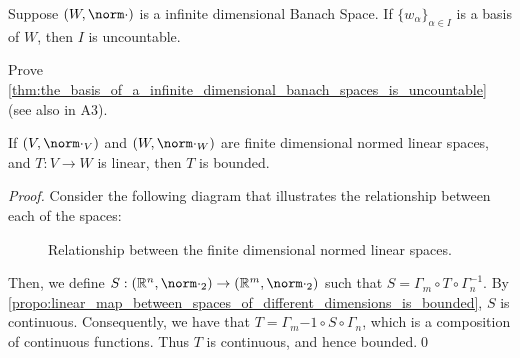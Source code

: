 \documentclass[notoc,notitlepage]{tufte-book}
\begin{document}
\begin{thm}\label{thm:the_basis_of_a_infinite_dimensional_banach_spaces_is_uncountable}
  Suppose $(W, \norm\cdot)$ is a infinite dimensional Banach Space. If $\{ w_\alpha \}_{\alpha \in I}$ is a basis of $W$, then $I$ is uncountable.
\end{thm}

\begin{ex}
  Prove \cref{thm:the_basis_of_a_infinite_dimensional_banach_spaces_is_uncountable} (see also in A3).
\end{ex}

\begin{thm}\label{thm:all_linear_maps_between_finite_dimensional_normed_linear_spaces_are_bounded}
  If $(V, \norm\cdot_V)$ and $(W, \norm\cdot_W)$ are finite dimensional normed linear spaces, and $T: V \to W$ is linear, then $T$ is bounded.
\end{thm}

\begin{proof}
  Consider the following diagram that illustrates the relationship between each of the spaces:
  \begin{figure}[ht]
    \centering
    \caption{Relationship between the finite dimensional normed linear spaces.}
    \label{fig:relationship_between_the_finite_dimensional_normed_linear_spaces}
  \end{figure}
  Then, we define $S : (\mathbb{R}^n, \norm\cdot_2) \to (\mathbb{R}^m, \norm\cdot_2)$ such that $S = \Gamma_m \circ T \circ \Gamma_n^{-1}$. By \cref{propo:linear_map_between_spaces_of_different_dimensions_is_bounded}, $S$ is continuous. Consequently, we have that $T = \Gamma_m{-1} \circ S \circ \Gamma_n$, which is a composition of continuous functions. Thus $T$ is continuous, and hence bounded.\qed\
\end{proof}
\end{document}
